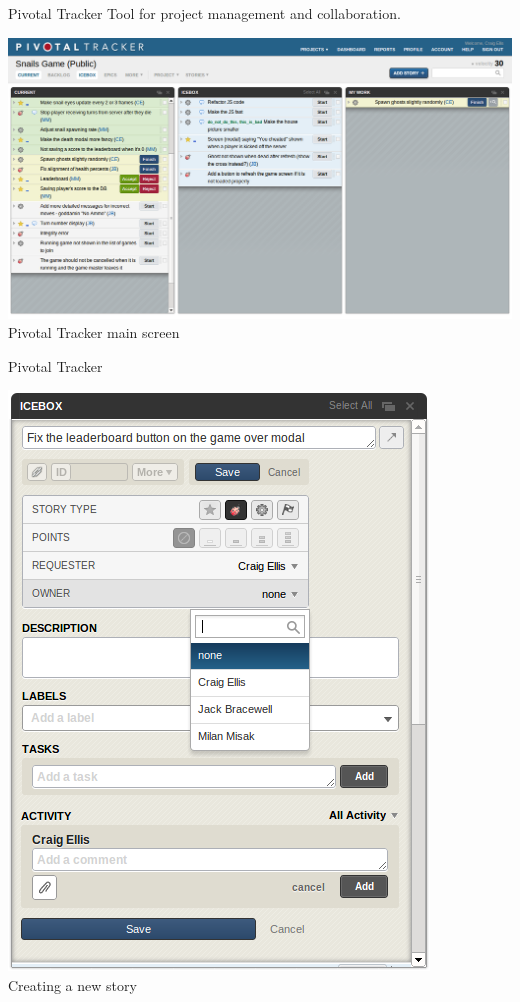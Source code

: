 \documentclass{beamer}
\begin{document}
\begin{frame}{Pivotal Tracker}
  Tool for project management and collaboration. \\ 
  \begin{center}
    \includegraphics[scale=0.25]{pivotal.png} \\
    Pivotal Tracker main screen
  \end{center}
\end{frame}

\begin{frame}{Pivotal Tracker}
  \begin{center}
    \includegraphics[scale=0.32]{pivotal_new_story.png} \\
    Creating a new story
  \end{center}
\end{frame}
\end{document}
